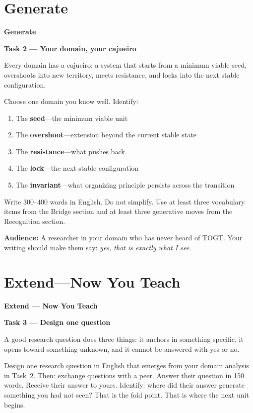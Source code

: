\documentclass[11pt, twoside, openright]{book}
\theoremstyle{plain}
\theoremstyle{definition}
\newenvironment{generatebox}{%
  \begin{mdframed}[backgroundcolor=GenerateBox,linecolor=red!50!black,linewidth=0.5pt,innertopmargin=6pt,innerbottommargin=6pt]
  \noindent\textbf{Generate}\par\medskip}{\end{mdframed}}
\newenvironment{extendbox}{%
  \begin{mdframed}[backgroundcolor=ExtendBox,linecolor=violet!70,linewidth=0.5pt,innertopmargin=6pt,innerbottommargin=6pt]
  \noindent\textbf{Extend --- Now You Teach}\par\medskip}{\end{mdframed}}
\begin{document}
\section{Generate}

\begin{generatebox}
\textbf{Task 2 --- Your domain, your cajueiro}

Every domain has a cajueiro: a system that starts from a minimum viable
seed, overshoots into new territory, meets resistance, and locks into
the next stable configuration.

Choose one domain you know well. Identify:
\begin{enumerate}[label=\arabic*.]
  \item The \textbf{seed}---the minimum viable unit
  \item The \textbf{overshoot}---extension beyond the current stable state
  \item The \textbf{resistance}---what pushes back
  \item The \textbf{lock}---the next stable configuration
  \item The \textbf{invariant}---what organizing principle persists across the transition
\end{enumerate}

Write 300--400 words in English. Do not simplify. Use at least three
vocabulary items from the Bridge section and at least three generative
moves from the Recognition section.

\medskip
\textbf{Audience:} A researcher in your domain who has never heard of TOGT.
Your writing should make them say: \textit{yes, that is exactly what I see.}
\end{generatebox}

\section{Extend---Now You Teach}

\begin{extendbox}
\textbf{Task 3 --- Design one question}

A good research question does three things: it anchors in something
specific, it opens toward something unknown, and it cannot be answered
with yes or no.

Design one research question in English that emerges from your domain
analysis in Task~2. Then: exchange questions with a peer. Answer their
question in 150 words. Receive their answer to yours. Identify: where
did their answer generate something you had not seen? That is the fold
point. That is where the next unit begins.
\end{extendbox}
\end{document}
